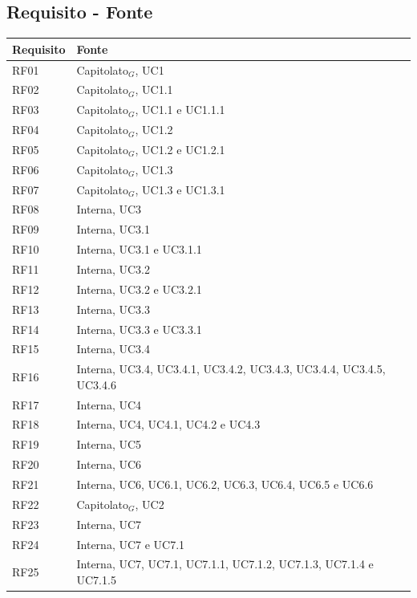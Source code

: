 \documentclass[10pt]{article}
\begin{document}
\begin{justify}
\subsection{Requisito - Fonte}
\begin{center}
\begin{longtable}{|>{\vspace{5pt}}C{2.7cm}<{\vspace{5pt}}|>{\vspace{5pt}}C{2.7cm}<{\vspace{5pt}}|}
\hline
\textbf{Requisito} & \textbf{Fonte}\\
\hline
RF01 & Capitolato$_G$, UC1\\
\hline
RF02 & Capitolato$_G$, UC1.1\\
\hline
RF03 & Capitolato$_G$, UC1.1 e UC1.1.1\\
\hline
RF04 & Capitolato$_G$, UC1.2\\
\hline
RF05 & Capitolato$_G$, UC1.2 e UC1.2.1\\
\hline
RF06 & Capitolato$_G$, UC1.3\\
\hline
RF07 & Capitolato$_G$, UC1.3 e UC1.3.1\\
\hline
RF08 & Interna, UC3\\
\hline
RF09 & Interna, UC3.1\\
\hline
RF10 & Interna, UC3.1 e UC3.1.1\\
\hline
RF11 & Interna, UC3.2\\
\hline
RF12 & Interna, UC3.2 e UC3.2.1\\
\hline
RF13 & Interna, UC3.3\\
\hline
RF14 & Interna, UC3.3 e UC3.3.1\\
\hline
RF15 & Interna, UC3.4\\
\hline
RF16 & Interna, UC3.4, UC3.4.1, UC3.4.2, UC3.4.3, UC3.4.4, UC3.4.5, UC3.4.6\\
\hline
RF17 & Interna, UC4\\
\hline
RF18 & Interna, UC4, UC4.1, UC4.2 e UC4.3\\
\hline
RF19 & Interna, UC5\\
\hline
RF20 & Interna, UC6\\
\hline
RF21 & Interna, UC6, UC6.1, UC6.2, UC6.3, UC6.4, UC6.5 e UC6.6\\
\hline
RF22 & Capitolato$_G$, UC2\\
\hline
RF23 & Interna, UC7\\
\hline
RF24 & Interna, UC7 e UC7.1\\
\hline
RF25 & Interna, UC7, UC7.1, UC7.1.1, UC7.1.2, UC7.1.3, UC7.1.4 e UC7.1.5\\

\end{longtable}
\end{center}
\end{justify}
\end{document}

